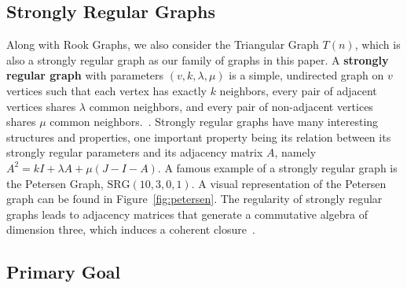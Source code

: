 \subsection{Strongly Regular Graphs}
Along with Rook Graphs, we also consider the Triangular Graph $T(n)$, which is also a strongly regular graph as our family of graphs in this paper. A \textbf{strongly regular graph} with parameters $(v,k,\lambda,\mu)$ is a simple, undirected graph on $v$ vertices such that each vertex has exactly $k$ neighbors, every pair of adjacent vertices shares $\lambda$ common neighbors, and every pair of non-adjacent vertices shares $\mu$ common neighbors.~\cite{godsil2001algebraic}. Strongly regular graphs have many interesting structures and properties, one important property being its relation between its strongly regular parameters and its adjacency matrix $A$, namely $A^2 = kI + \lambda A + \mu(J-I-A)$. A famous example of a strongly regular graph is the Petersen Graph, $\operatorname{SRG(10,3,0,1)}$. A visual representation of the Petersen graph can be found in Figure~\ref{fig:petersen}. The regularity of strongly regular graphs leads to adjacency matrices that generate a commutative algebra of dimension three, which induces a coherent closure~\cite{bannai1984algebraic, greaves2024coherentrankgrapheigenvalues}. 


\subsection{Primary Goal}

